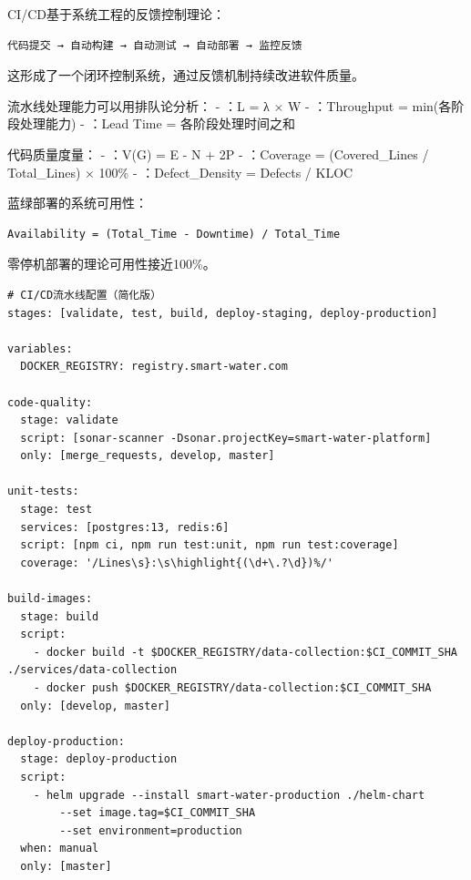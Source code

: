 

CI/CD基于系统工程的反馈控制理论：

\begin{lstlisting}
代码提交 → 自动构建 → 自动测试 → 自动部署 → 监控反馈
\end{lstlisting}

这形成了一个闭环控制系统，通过反馈机制持续改进软件质量。


流水线处理能力可以用排队论分析： - ：L = λ × W - ：Throughput = min(各阶段处理能力) - ：Lead Time = 各阶段处理时间之和


代码质量度量： - ：V(G) = E - N + 2P - ：Coverage = (Covered\_Lines / Total\_Lines) × 100\% - ：Defect\_Density = Defects / KLOC


蓝绿部署的系统可用性：

\begin{lstlisting}
Availability = (Total_Time - Downtime) / Total_Time
\end{lstlisting}

零停机部署的理论可用性接近100\%。

\begin{lstlisting}
# CI/CD流水线配置（简化版）
stages: [validate, test, build, deploy-staging, deploy-production]

variables:
  DOCKER_REGISTRY: registry.smart-water.com

code-quality:
  stage: validate
  script: [sonar-scanner -Dsonar.projectKey=smart-water-platform]
  only: [merge_requests, develop, master]

unit-tests:
  stage: test
  services: [postgres:13, redis:6]
  script: [npm ci, npm run test:unit, npm run test:coverage]
  coverage: '/Lines\s}:\s\highlight{(\d+\.?\d})%/'

build-images:
  stage: build
  script:
    - docker build -t $DOCKER_REGISTRY/data-collection:$CI_COMMIT_SHA ./services/data-collection
    - docker push $DOCKER_REGISTRY/data-collection:$CI_COMMIT_SHA
  only: [develop, master]

deploy-production:
  stage: deploy-production
  script:
    - helm upgrade --install smart-water-production ./helm-chart 
        --set image.tag=$CI_COMMIT_SHA
        --set environment=production
  when: manual
  only: [master]
\end{lstlisting}

